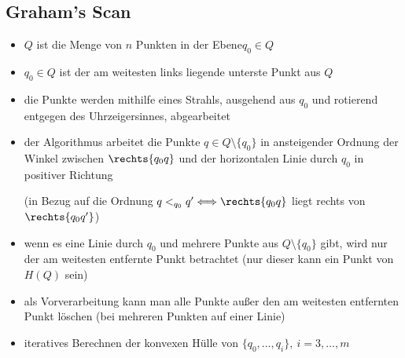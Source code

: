 \subsection{Graham's Scan}
\begin{itemize}[itemsep=0pt]
	\item $Q$ ist die Menge von $n$ Punkten in der Ebene$q_0\in Q$
	\item $q_0\in Q$ ist der am weitesten links liegende unterste Punkt aus $Q$
	\item die Punkte werden mithilfe eines Strahls, ausgehend aus $q_0$ und rotierend entgegen des Uhrzeigersinnes, abgearbeitet
	\item der Algorithmus arbeitet die Punkte $q\in Q\setminus \{q_0\}$ in ansteigender Ordnung der Winkel zwischen $\rechts{q_0q}$ und der horizontalen Linie durch $q_0$ in positiver Richtung
	\begin{center}(in Bezug auf die Ordnung $q<_{q_0}q' \Longleftrightarrow \rechts{q_0q}$ liegt rechts von $\rechts{q_0q'}$)\end{center}
	\item wenn es eine Linie durch $q_0$ und mehrere Punkte aus $Q\setminus \{q_0\}$ gibt, wird nur der am weitesten entfernte Punkt betrachtet (nur dieser kann ein Punkt von $H(Q)$ sein)
	\item als Vorverarbeitung kann man alle Punkte außer den am weitesten entfernten Punkt löschen (bei mehreren Punkten auf einer Linie)
	\item iteratives Berechnen der konvexen Hülle von $\{q_0,\dots,q_i\},~i=3,\dots,m$
\end{itemize}
\topbreak
\up\up
